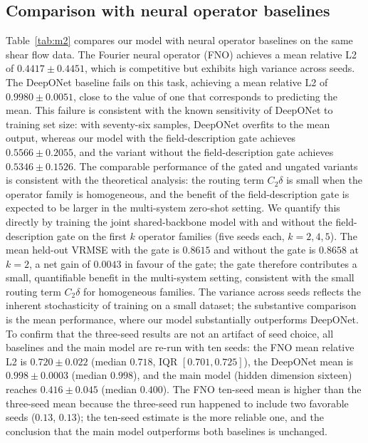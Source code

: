 \documentclass[preprint,12pt]{elsarticle}
\begin{document}
\subsection{Comparison with neural operator baselines}
Table~\ref{tab:m2} compares our model with neural operator baselines on the same shear flow data. The Fourier neural operator (FNO) achieves a mean relative L2 of $0.4417\pm0.4451$, which is competitive but exhibits high variance across seeds. The DeepONet baseline fails on this task, achieving a mean relative L2 of $0.9980\pm0.0051$, close to the value of one that corresponds to predicting the mean. This failure is consistent with the known sensitivity of DeepONet to training set size: with seventy-six samples, DeepONet overfits to the mean output, whereas our model with the field-description gate achieves $0.5566\pm0.2055$, and the variant without the field-description gate achieves $0.5346\pm0.1526$. The comparable performance of the gated and ungated variants is consistent with the theoretical analysis: the routing term $C_2\delta$ is small when the operator family is homogeneous, and the benefit of the field-description gate is expected to be larger in the multi-system zero-shot setting. We quantify this directly by training the joint shared-backbone model with and without the field-description gate on the first $k$ operator families (five seeds each, $k=2,4,5$). The mean held-out VRMSE with the gate is $0.8615$ and without the gate is $0.8658$ at $k=2$, a net gain of $0.0043$ in favour of the gate; the gate therefore contributes a small, quantifiable benefit in the multi-system setting, consistent with the small routing term $C_2\delta$ for homogeneous families. The variance across seeds reflects the inherent stochasticity of training on a small dataset; the substantive comparison is the mean performance, where our model substantially outperforms DeepONet. To confirm that the three-seed results are not an artifact of seed choice, all baselines and the main model are re-run with ten seeds: the FNO mean relative L2 is $0.720\pm0.022$ (median $0.718$, IQR $[0.701,0.725]$), the DeepONet mean is $0.998\pm0.0003$ (median $0.998$), and the main model (hidden dimension sixteen) reaches $0.416\pm0.045$ (median $0.400$). The FNO ten-seed mean is higher than the three-seed mean because the three-seed run happened to include two favorable seeds ($0.13$, $0.13$); the ten-seed estimate is the more reliable one, and the conclusion that the main model outperforms both baselines is unchanged.
\end{document}
